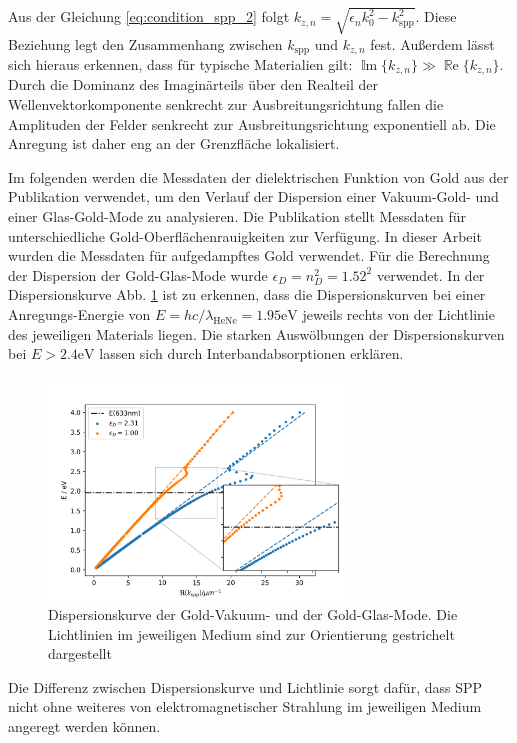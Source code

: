 \documentclass[titlepage]{article}
\renewcommand{\Re}{\operatorname{\mathbb{R}e}}
\renewcommand{\Im}{\operatorname{\mathbb{I}m}}
\begin{document}
	Aus der Gleichung \eqref{eq:condition_spp_2} folgt $k_{z, n} = \sqrt{\epsilon_n k_0^2 - k_{\mathrm{spp}}^2}$. Diese Beziehung legt den Zusammenhang zwischen $k_{\mathrm{spp}}$ und $k_{z, n}$ fest. Außerdem lässt sich hieraus erkennen, dass für typische Materialien gilt: $ \Im\{k_{z, n}\} \gg \Re\{k_{z, n}\}$. Durch die Dominanz des Imaginärteils über den Realteil der Wellenvektorkomponente senkrecht zur Ausbreitungsrichtung fallen die Amplituden der Felder senkrecht zur Ausbreitungsrichtung exponentiell ab. Die Anregung ist daher eng an der Grenzfläche lokalisiert. 
	
	Im folgenden werden die Messdaten der dielektrischen Funktion von Gold aus der Publikation \cite{Olmon.2012} verwendet, um den Verlauf der Dispersion einer Vakuum-Gold- und einer Glas-Gold-Mode zu analysieren.  Die Publikation stellt Messdaten für unterschiedliche Gold-Oberflächenrauigkeiten zur Verfügung. In dieser Arbeit wurden die Messdaten für aufgedampftes Gold verwendet. Für die Berechnung der Dispersion der Gold-Glas-Mode wurde $\epsilon_D = n_D^2 = 1.52^2$  verwendet. In der Dispersionskurve Abb. \ref{fig:dispersion_spp} ist zu erkennen, dass die Dispersionskurven bei einer Anregungs-Energie von $E = hc/\lambda_{\mathrm{HeNe}}= 1.95\mathrm{eV}$ jeweils rechts von der Lichtlinie des jeweiligen Materials liegen. Die starken Auswölbungen der Dispersionskurven bei $E > 2.4 \mathrm{eV}$ lassen sich durch Interbandabsorptionen erklären.
	\begin{figure}[h]
		\label{fig:dispersion_spp}
		\centering
		\includegraphics[width=0.7\textwidth]{figures/dispersion.png}
		\caption[Dispersion SPP]{Dispersionskurve der Gold-Vakuum- und der Gold-Glas-Mode. Die Lichtlinien im jeweiligen Medium sind zur Orientierung gestrichelt dargestellt}		
	\end{figure}
	Die Differenz zwischen Dispersionskurve und Lichtlinie sorgt dafür, dass SPP nicht ohne weiteres von elektromagnetischer Strahlung im jeweiligen Medium angeregt werden können.	
\end{document}
